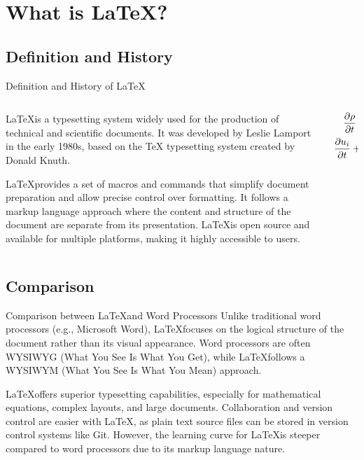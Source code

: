 \documentclass{SUSTechBeamer}
\begin{document}
\section{What is \LaTeX?}

\subsection{Definition and History}
\begin{frame}{Definition and History of \LaTeX}
    \begin{columns}
        \begin{column}{0.6\textwidth}
  \LaTeX is a typesetting system widely used for the production of technical and scientific documents. It was developed by Leslie Lamport in the early 1980s, based on the TeX typesetting system created by Donald Knuth.

  \LaTeX provides a set of macros and commands that simplify document preparation and allow precise control over formatting. It follows a markup language approach where the content and structure of the document are separate from its presentation. \LaTeX is open source and available for multiple platforms, making it highly accessible to users.
        \end{column}
        \begin{column}{0.4\textwidth}
            \begin{align}
                \frac{\partial \rho}{\partial t}+\rho\frac{\partial u_i}{\partial x_i}&=0\\
                \frac{\partial u_i}{\partial t}+u_j\frac{\partial u_i}{\partial x_j}&=\frac{1}{\rho}\frac{\partial \sigma_{ij}}{\partial x_j}+f_i
            \end{align}
        \end{column}
    \end{columns}
\end{frame}

\subsection{Comparison}
\begin{frame}{Comparison between \LaTeX and Word Processors}
  Unlike traditional word processors (e.g., Microsoft Word), \LaTeX focuses on the logical structure of the document rather than its visual appearance. Word processors are often WYSIWYG (What You See Is What You Get), while \LaTeX follows a WYSIWYM (What You See Is What You Mean) approach.

  \LaTeX offers superior typesetting capabilities, especially for mathematical equations, complex layouts, and large documents. Collaboration and version control are easier with \LaTeX, as plain text source files can be stored in version control systems like Git. However, the learning curve for \LaTeX is steeper compared to word processors due to its markup language nature.
\end{frame}
\end{document}
